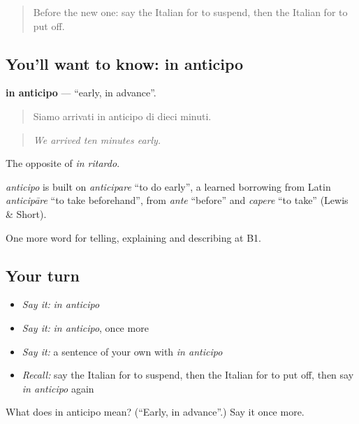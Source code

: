 \begin{quote}
Before the new one: say the Italian for to suspend, then the Italian for to put off.
\end{quote}

\subsection*{You'll want to know: in anticipo}
\textbf{in anticipo} — \textquotedblleft{}early, in advance\textquotedblright{}.

\begin{quote}
Siamo arrivati in anticipo di dieci minuti.
\end{quote}

\begin{quote}
\emph{We arrived ten minutes early.}
\end{quote}

The opposite of \emph{in ritardo}.

\begin{cousinweb}
\emph{anticipo} is built on \emph{anticipare} \textquotedblleft{}to do early\textquotedblright{}, a learned borrowing from Latin \emph{anticipāre} \textquotedblleft{}to take beforehand\textquotedblright{}, from \emph{ante} \textquotedblleft{}before\textquotedblright{} and \emph{capere} \textquotedblleft{}to take\textquotedblright{} (Lewis \& Short).
\end{cousinweb}

\begin{grammarlens}[title={What you've built}]
One more word for telling, explaining and describing at B1.
\end{grammarlens}

\subsection*{Your turn}
\begin{itemize}
\raggedright
  \item \emph{Say it:} \emph{in anticipo}
  \item \emph{Say it:} \emph{in anticipo}, once more
  \item \emph{Say it:} a sentence of your own with \emph{in anticipo}
  \item \emph{Recall:} say the Italian for to suspend, then the Italian for to put off, then say \emph{in anticipo} again
\end{itemize}

\begin{tcolorbox}[breakable,colback=teal!4,colframe=teal!35!black,title={Before you move on}]
What does in anticipo mean? (\textquotedblleft{}Early, in advance\textquotedblright{}.) Say it once more.
\end{tcolorbox}
